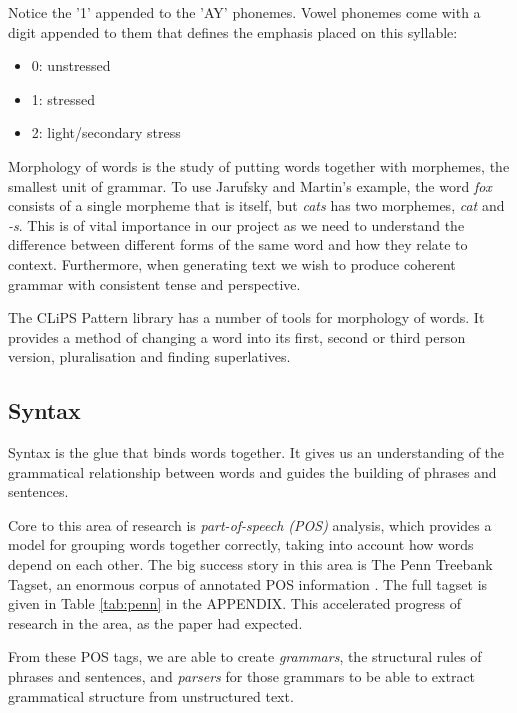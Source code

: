 Notice the '1' appended to the 'AY' phonemes. Vowel phonemes come with a digit appended to them that defines the emphasis placed on this syllable:
\begin{itemize}
\item{0: unstressed}
\item{1: stressed}
\item{2: light/secondary stress}
\end{itemize}

Morphology of words is the study of putting words together with morphemes, the smallest unit of grammar. To use Jarufsky and Martin's example, the word \textit{fox} consists of a single morpheme that is itself, but \textit{cats} has two morphemes, \textit{cat} and \textit{-s}. This is of vital importance in our project as we need to understand the difference between different forms of the same word and how they relate to context. Furthermore, when generating text we wish to produce coherent grammar with consistent tense and perspective.

The CLiPS Pattern library has a number of tools for morphology of words. It provides a method of changing a word into its first, second or third person version, pluralisation and finding superlatives.\cite{de2012pattern}


\subsection{Syntax}
\label{sec:syntax}
Syntax is the glue that binds words together. It gives us an understanding of the grammatical relationship between words and guides the building of phrases and sentences.

Core to this area of research is \textit{part-of-speech (POS)} analysis, which provides a model for grouping words together correctly, taking into account how words depend on each other. The big success story in this area is The Penn Treebank Tagset, an enormous corpus of annotated POS information \cite{marcus1993building}. The full tagset is given in Table \ref{tab:penn} in the APPENDIX. This accelerated progress of research in the area, as the paper had expected. 

From these POS tags, we are able to create \textit{grammars}, the structural rules of phrases and sentences, and \textit{parsers} for those grammars to be able to extract grammatical structure from unstructured text.

